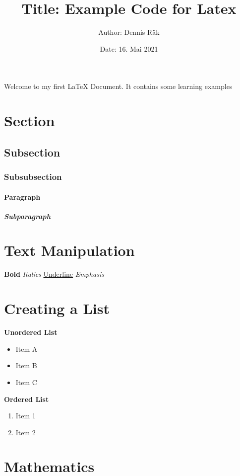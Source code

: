 \documentclass[12pt, letter]{article}			%
\title{Title: Example Code for Latex}	    %
\author{Author: Dennis Räk}						    %
\date{Date: 16. Mai 2021}							    %
\begin{document}
		\maketitle

		Welcome to my first  \LaTeX{} Document. It contains some learning examples

\newpage{}									        %
\section{Section}							      %
\subsection{Subsection} 			      %
\subsubsection{Subsubsection}	      %
\paragraph{Paragraph}					      %
\subparagraph{Subparagraph}		      %

\section{Text Manipulation}
	 \textbf{Bold}								    %
	 \textit{Italics} 								%
	 \underline{Underline}						%
	 \emph{Emphasis}							    %
	 \\										            %
\section{Creating a List}
	\textbf{Unordered List}
	\begin{itemize}								    %
		\item Item A
		\item Item B
		\item Item C
	\end{itemize}
	\textbf{Ordered List}							%
	\begin {enumerate}
		\item Item 1
		\item Item 2
	\end{enumerate}
	
\newpage{}

\section{Mathematics}
\end{document}
